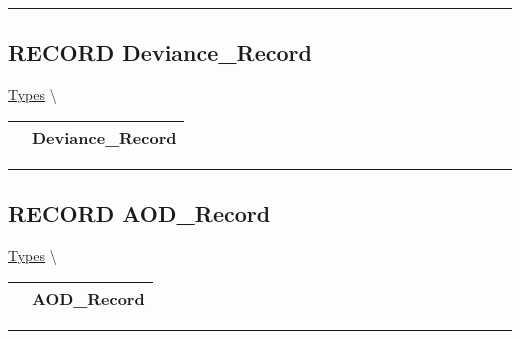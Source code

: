 \par


\rule{\linewidth}{0.5pt}
\subsection*{\textsf{\colorbox{headtoc}{\color{white} RECORD}
Deviance\_Record}}

\hypertarget{ecldoc:logisticregression.types.deviance_record}{}
\hspace{0pt} \hyperlink{ecldoc:LogisticRegression.Types}{Types} \textbackslash 

{\renewcommand{\arraystretch}{1.5}
\begin{tabularx}{\textwidth}{|>{\raggedright\arraybackslash}l|X|}
\hline
\hspace{0pt}\mytexttt{\color{red} } & \textbf{Deviance\_Record} \\
\hline
\end{tabularx}
}

\par


\rule{\linewidth}{0.5pt}
\subsection*{\textsf{\colorbox{headtoc}{\color{white} RECORD}
AOD\_Record}}

\hypertarget{ecldoc:logisticregression.types.aod_record}{}
\hspace{0pt} \hyperlink{ecldoc:LogisticRegression.Types}{Types} \textbackslash 

{\renewcommand{\arraystretch}{1.5}
\begin{tabularx}{\textwidth}{|>{\raggedright\arraybackslash}l|X|}
\hline
\hspace{0pt}\mytexttt{\color{red} } & \textbf{AOD\_Record} \\
\hline
\end{tabularx}
}

\par


\rule{\linewidth}{0.5pt}


